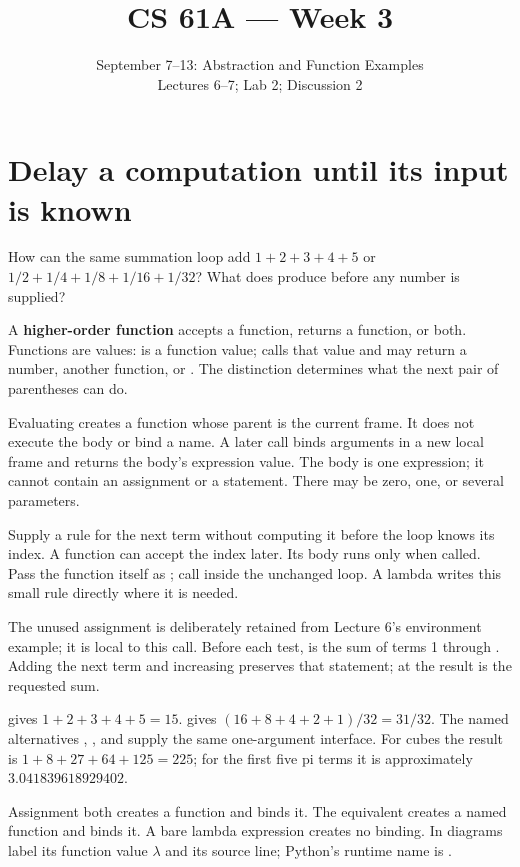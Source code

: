 \documentclass[10pt]{scrartcl}
\title{CS 61A --- Week 3}
\subtitle{September 7--13: Abstraction and Function Examples\\Lectures 6--7; Lab 2; Discussion 2}
\author{}\date{}\ihead{}
\begin{document}
\maketitle
\section{Delay a computation until its input is known}
\begin{qbox}
How can the same summation loop add $1+2+3+4+5$ or $1/2+1/4+1/8+1/16+1/32$? What does  produce before any number is supplied?
\end{qbox}
A \textbf{higher-order function} accepts a function, returns a function, or both. Functions are values:  is a function value;  calls that value and may return a number, another function, or . The distinction determines what the next pair of parentheses can do.
\begin{proposition*}
Evaluating  creates a function whose parent is the current frame. It does not execute the body or bind a name. A later call binds arguments in a new local frame and returns the body's expression value. The body is one expression; it cannot contain an assignment or a  statement. There may be zero, one, or several parameters.
\end{proposition*}
\begin{motive}
\ii[Want.] Supply a rule for the next term without computing it before the loop knows its index.
\ii[Know.] A function can accept the index later. Its body runs only when called.
 Pass the function itself as ; call  inside the unchanged loop. A lambda writes this small rule directly where it is needed.
\end{motive}
The unused  assignment is deliberately retained from Lecture 6's environment example; it is local to this call. Before each test,  is the sum of terms 1 through . Adding the next term and increasing  preserves that statement; at  the result is the requested sum.
\begin{example*}
 gives $1+2+3+4+5=15$.
 gives $(16+8+4+2+1)/32=31/32$.
The named alternatives , , and  supply the same one-argument interface. For cubes the result is $1+8+27+64+125=225$; for the first five pi terms it is approximately $3.041839618929402$.
\end{example*}
Assignment  both creates a function and binds it. The equivalent  creates a named function and binds it. A bare lambda expression creates no binding. In diagrams label its function value $\lambda$ and its source line; Python's runtime name is .
\end{document}
